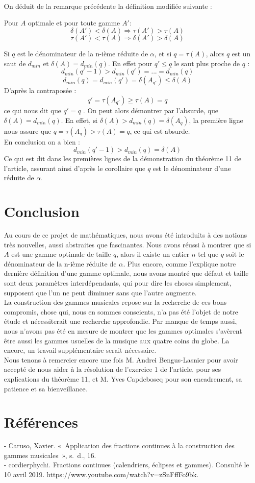\documentclass[moyen]{classeUPD}
\newenvironment{definition}{
	\begin{lrbox}{\tempbox}
		\begin{minipage}{\textwidth}
		}{
		\end{minipage}
	\end{lrbox}
	\begin{center}
		\fcolorbox[HTML]{222222}{EEEEEE}{
			\usebox{\tempbox}
		}
	\end{center}
}
\begin{document}
 On déduit de la remarque précédente la définition modifiée suivante :
 
 \begin{definition}
 Pour $A$ optimale et pour toute gamme $A'$:
 $$\delta(A') < \delta(A) \Rightarrow \tau(A') > \tau(A)$$
 $$\tau(A') < \tau(A) \Rightarrow \delta(A') > \delta(A)$$
 \end{definition}
 
 Si $q$ est le dénominateur de la n-ième réduite de $\alpha$, et si  $q =\tau(A) $, alors $q$ est un saut de $d_{min}$ et $\delta(A)= d_{min}(q)$. En effet pour $q'\leq q$ le saut plus proche de $q$ :
 $$d_{min}(q'-1) >d_{min}(q')=...=d_{min}(q) $$
 $$d_{min}(q) = d_{min}(q')=\delta(A_{q'})\leq \delta(A)$$
 D'après la contraposée :
 $$q' = \tau (A_{q'})\ge \tau (A) = q$$
ce qui nous dit que $q' = q$ . On peut alors démontrer par l’absurde, que $\delta(A)= d_{min}(q)$. En effet, si $\delta(A) > d_{min}(q) = \delta(A_{q})$,  la première ligne nous assure que $q = \tau (A_{q}) > \tau (A) = q$, ce qui est absurde. \\
En conclusion on a bien :
$$d_{min}(q'-1) >d_{min}(q)=\delta(A) $$
Ce qui est dit dans les premières lignes de la démonstration du théorème 11 de l'article, assurant ainsi d'après le corollaire que $q$ est le dénominateur d'une réduite de $\alpha$.



\clearpage
\chapter*{Conclusion}

Au cours de ce projet de mathématiques, nous avons été introduits à des notions très nouvelles, aussi abstraites que fascinantes. Nous avons réussi à montrer que si $A$ est une gamme optimale de taille $q$, alors il existe un entier $n$ tel que $q$ soit le dénominateur de la n-ième réduite de $\alpha$. Plus encore, comme l'explique notre dernière définition d'une gamme optimale, nous avons montré que défaut et taille sont deux paramètres interdépendants, qui pour dire les choses simplement, supposent que l'un ne peut diminuer sans que l'autre augmente.\\ La construction des gammes musicales repose sur la recherche de ces bons compromis, chose qui, nous en sommes conscients, n'a pas été l'objet de notre étude et nécessiterait une recherche approfondie. Par manque de temps aussi, nous n'avons pas été en mesure de montrer que les gammes optimales s'avèrent être aussi les gammes usuelles de la musique aux quatre coins du globe. La encore, un travail supplémentaire serait nécessaire.\\ Nous tenons à remercier encore une fois M. Andrei Bengus-Lasnier pour avoir accepté de nous aider à la résolution de l'exercice 1 de l'article, pour ses explications du théorème 11, et M. Yves Capdeboscq pour son encadrement, sa patience et sa bienveillance.

\chapter{Références}

- Caruso, Xavier. « Application des fractions continues à la construction des gammes musicales », s. d., 16.\\
- cordierphychi. Fractions continues (calendriers, éclipses et gammes). Consulté le 10 avril 2019. https://www.youtube.com/watch?v=zSnFffFo9bk.
\end{document}
